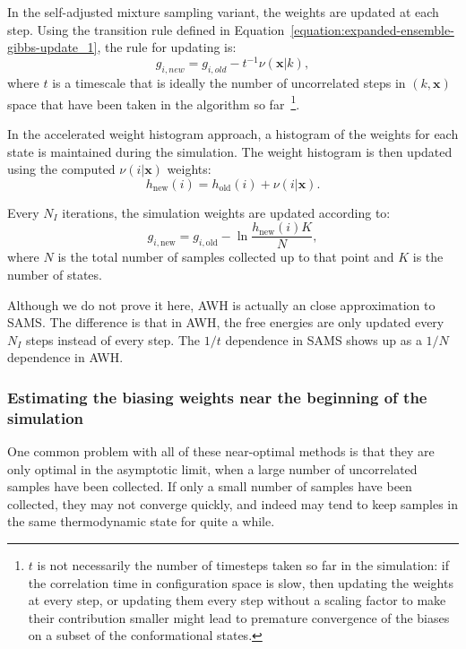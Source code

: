 \documentclass[9pt,review]{livecoms}
\newcommand{\vx}{\mathbf{x}}
\begin{document}
In the self-adjusted mixture sampling variant, the weights are updated at each step. Using the transition rule defined in Equation~\ref{equation:expanded-ensemble-gibbs-update_1}, the rule for updating is:
\begin{equation}
g_{i,new} = g_{i,old} - t^{-1}\nu(\vx|k),
\end{equation}
where $t$ is a timescale that is ideally the number of uncorrelated steps in $(k,\vx)$ space that have been taken in the algorithm so far~\footnote{$t$ is not necessarily the number of timesteps taken so far in the simulation: if the correlation time in configuration space is slow, then updating the weights at every step, or updating them every step without a scaling factor to make their contribution smaller might lead to premature convergence of the biases on a subset of the conformational states.}.

In the accelerated weight histogram approach, a histogram of the weights for each state is maintained during the simulation. The weight histogram is then updated using the computed $\nu(i|\vx)$ weights:
\begin{equation}
h_{\mathrm{new}}(i) = h_{\mathrm{old}}(i) + \nu(i|\vx).
\label{eq:awh-weight-histogram}
\end{equation}

Every $N_I$ iterations, the simulation weights are updated according to:
\begin{equation}
g_{i,\mathrm{new}} = g_{i,\mathrm{old}} - \ln{\frac{h_{\mathrm{new}}(i)K}{N}},
\label{eq:awh_free_energy_up}
\end{equation}
where $N$ is the total number of samples collected up to that point and $K$ is the number of states.


Although we do not prove it here, AWH is actually an close approximation to SAMS. The difference is that in AWH, the free energies are only updated every $N_I$ steps instead of every step. The $1/t$ dependence in SAMS shows up as a $1/N$ dependence in AWH.

\subsubsection{Estimating the biasing weights near the beginning of the simulation}

One common problem with all of these near-optimal methods is that they are only optimal in the asymptotic limit, when a large number of uncorrelated samples have been collected.  If only a small number of samples have been collected, they may not converge quickly, and indeed may tend to keep samples in the same thermodynamic state for quite a while.
\end{document}
